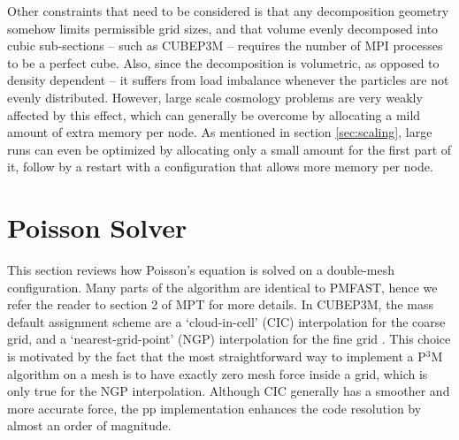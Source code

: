 \documentclass[useAMS,usenatbib]{mn2e}
\begin{document}
Other constraints that need to be considered is that any decomposition geometry somehow 
limits permissible grid sizes, and that volume evenly decomposed into cubic sub-sections 
--  such as {\small CUBEP3M} -- requires the number of {\small MPI} processes to be a perfect cube.
Also,  since the decomposition is volumetric, as opposed to density dependent -- 
it suffers from load imbalance whenever the particles are not evenly distributed.
However, large scale cosmology problems are very weakly affected by this effect, which
can generally  be overcome by allocating a mild amount of extra memory per node.
As mentioned in section \ref{sec:scaling}, large runs can even be optimized by  allocating only a small amount for the first part of it,
follow by a restart with a configuration that allows more memory per node.

%

\section{Poisson Solver}
\label{sec:Poisson}


This section reviews how Poisson's equation is solved on a double-mesh configuration. 
Many parts of the algorithm are identical to {\small PMFAST}, hence we refer the reader 
to section 2 of MPT for more details. In {\small CUBEP3M}, the mass default assignment scheme are
a `cloud-in-cell' (CIC) interpolation for the coarse grid,  and a `nearest-grid-point' (NGP) interpolation 
for the fine grid \citep{1981csup.book.....H}. This choice is motivated by the fact that the most straightforward 
way to implement a P$^3$M algorithm on a mesh is to have exactly zero mesh force inside a grid, 
which is only true for the NGP interpolation. Although CIC generally has a smoother and more accurate force,
the pp implementation enhances the code resolution by almost an order of magnitude. 
\end{document}
